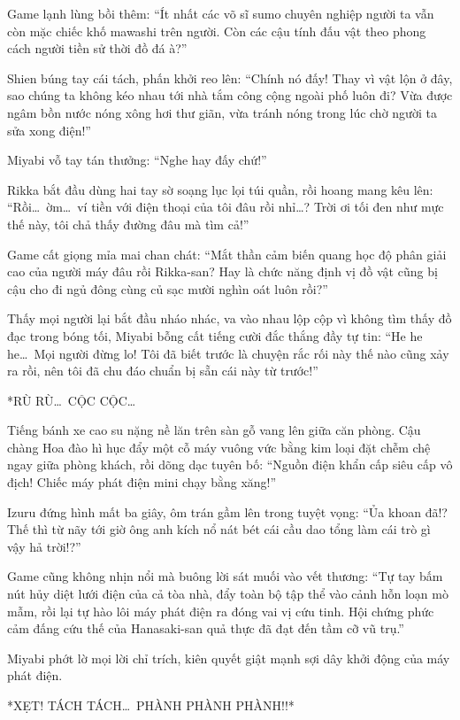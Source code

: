 \documentclass[../main.tex]{subfiles}
\begin{document}
Game lạnh lùng bồi thêm: ``Ít nhất các võ sĩ sumo chuyên nghiệp người ta vẫn còn mặc chiếc khố mawashi trên người. Còn các cậu tính đấu vật theo phong cách người tiền sử thời đồ đá à?''

Shien búng tay cái tách, phấn khởi reo lên: ``Chính nó đấy! Thay vì vật lộn ở đây, sao chúng ta không kéo nhau tới nhà tắm công cộng ngoài phố luôn đi? Vừa được ngâm bồn nước nóng xông hơi thư giãn, vừa tránh nóng trong lúc chờ người ta sửa xong điện!''

Miyabi vỗ tay tán thưởng: ``Nghe hay đấy chứ!''

Rikka bắt đầu dùng hai tay sờ soạng lục lọi túi quần, rồi hoang mang kêu lên: ``Rồi\dots\ ờm\dots\ ví tiền với điện thoại của tôi đâu rồi nhỉ\dots? Trời ơi tối đen như mực thế này, tôi chả thấy đường đâu mà tìm cả!''

Game cất giọng mỉa mai chan chát: ``Mắt thần cảm biến quang học độ phân giải cao của người máy đâu rồi Rikka-san? Hay là chức năng định vị đồ vật cũng bị cậu cho đi ngủ đông cùng củ sạc mười nghìn oát luôn rồi?''

Thấy mọi người lại bắt đầu nháo nhác, va vào nhau lộp cộp vì không tìm thấy đồ đạc trong bóng tối, Miyabi bỗng cất tiếng cười đắc thắng đầy tự tin: ``He he he\dots\ Mọi người đừng lo! Tôi đã biết trước là chuyện rắc rối này thế nào cũng xảy ra rồi, nên tôi đã chu đáo chuẩn bị sẵn cái này từ trước!''

*RÙ RÙ\dots\ CỘC CỘC\dots*

Tiếng bánh xe cao su nặng nề lăn trên sàn gỗ vang lên giữa căn phòng. Cậu chàng Hoa đào hì hục đẩy một cỗ máy vuông vức bằng kim loại đặt chễm chệ ngay giữa phòng khách, rồi dõng dạc tuyên bố: ``Nguồn điện khẩn cấp siêu cấp vô địch! Chiếc máy phát điện mini chạy bằng xăng!''

Izuru đứng hình mất ba giây, ôm trán gầm lên trong tuyệt vọng: ``Ủa khoan đã!? Thế thì từ nãy tới giờ ông anh kích nổ nát bét cái cầu dao tổng làm cái trò gì vậy hả trời!?''

Game cũng không nhịn nổi mà buông lời sát muối vào vết thương: ``Tự tay bấm nút hủy diệt lưới điện của cả tòa nhà, đẩy toàn bộ tập thể vào cảnh hỗn loạn mò mẫm, rồi lại tự hào lôi máy phát điện ra đóng vai vị cứu tinh. Hội chứng phức cảm đấng cứu thế của Hanasaki-san quả thực đã đạt đến tầm cỡ vũ trụ.''

Miyabi phớt lờ mọi lời chỉ trích, kiên quyết giật mạnh sợi dây khởi động của máy phát điện.

*XẸT! TÁCH TÁCH\dots\ PHÀNH PHÀNH PHÀNH!!*
\end{document}
